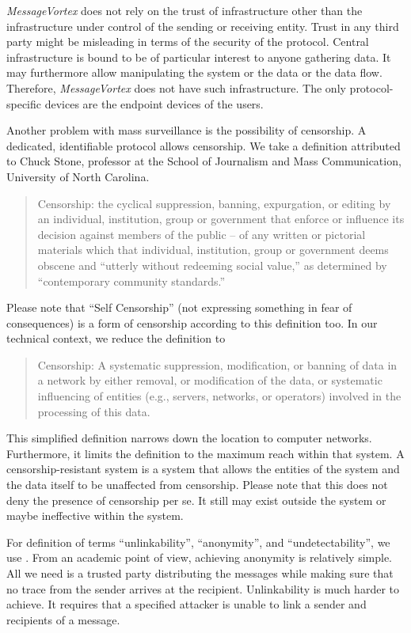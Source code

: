 \documentclass[acmsmall, screen]{acmart}
\begin{document}
\emph{MessageVortex} does not rely on the trust of infrastructure other than the infrastructure under control of the sending or receiving entity. Trust in any third party might be misleading in terms of the security of the protocol. Central infrastructure is bound to be of particular interest to anyone gathering data. It may furthermore allow manipulating the system or the data or the data flow. Therefore, \emph{MessageVortex} does not have such infrastructure. The only protocol-specific devices are the endpoint devices of the users.

Another problem with mass surveillance is the possibility of censorship. A dedicated, identifiable protocol allows censorship. We take a definition attributed to Chuck Stone, professor at the School of Journalism and Mass Communication, University of North Carolina. 

\begin{quote}
	Censorship: the cyclical suppression, banning, expurgation, or editing by an individual, institution, group or government that enforce or influence its decision against members of the public -- of any written or pictorial materials which that individual, institution, group or government deems obscene and ``utterly without redeeming social value,'' as determined by ``contemporary community standards.''
\end{quote}

Please note that ``Self Censorship'' (not expressing something in fear of consequences)  is a form of censorship according to this definition too. In our technical context, we reduce the definition to
\begin{quote}
	Censorship: A systematic suppression, modification, or banning of data in a network by either removal, or modification of the data, or systematic influencing of entities (e.g., servers, networks, or operators) involved in the processing of this data.
\end{quote}

This simplified definition narrows down the location to computer networks.  Furthermore, it limits the definition to the maximum reach within that system. A censorship-resistant system is a system that allows the entities of the system and the data itself to be unaffected from censorship. Please note that this does not deny the presence of censorship per se. It still may exist outside the system or maybe ineffective within the system. 

For definition of terms ``unlinkability'', ``anonymity'', and ``undetectability'', we use \cite{anon_terminology}. From an academic point of view, achieving anonymity is relatively simple. All we need is a trusted party distributing the messages while making sure that no trace from the sender arrives at the recipient. Unlinkability is much harder to achieve. It requires that a specified attacker is unable to link a sender and recipients of a message. 
\end{document}
